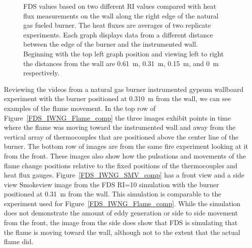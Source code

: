 \documentclass[twoside]{uocthesis}
\begin{document}
{\begin{figure}[ht!]
  \caption[FDS values based on two different RI values compared with heat flux measurements on the wall along the right edge of the natural gas fueled burner]{FDS values based on two different RI values compared with heat flux measurements on the wall along the right edge of the natural gas fueled burner. The heat fluxes are averages of two replicate experiments. Each graph displays data from a different distance between the edge of the burner and the instrumented wall.  Beginning with the top left graph position and viewing left to right the distances from the wall are 0.61~m, 0.31~m, 0.15~m, and 0~m respectively.}
  \label{FDS_HFEdge_IWNG_comp}
\end{figure}

Reviewing the videos from a natural gas burner instrumented gypsum wallboard experiment with the burner positioned at 0.310~m from the wall, we can see examples of the flame movement.  In the top row of Figure~\ref{FDS_IWNG_Flame_comp} the three images exhibit points in time where the flame was moving toward the instrumented wall and away from the vertical array of thermocouples that are positioned above the center line of the burner.  The bottom row of images are from the same fire experiment looking at it from the front.  These images also show how the pulsations and movements of the flame change positions relative to the fixed positions of the thermocouples and heat flux gauges. 
Figure~\ref{FDS_IWNG_SMV_comp} has a front view and a side view Smokeview image from the FDS RI=10 simulation with the burner positioned at 0.31~m from the wall.  This simulation is comparable to the experiment used for Figure~\ref{FDS_IWNG_Flame_comp}.  While the simulation does not demonstrate the amount of eddy generation or side to side movement from the front, the image from the side does show that FDS is simulating that the flame is moving toward the wall, although not to the extent that the actual flame did. 

}
\end{document}
